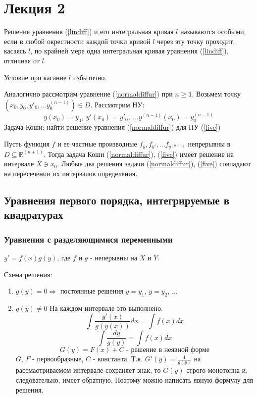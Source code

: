 \section{Лекция 2}
  \begin{df}
  Решение уравнения (\ref{lindiff}) и его интегральная кривая $l$ называются особыми, если в любой окрестности каждой точки кривой $l$ через эту точку проходит, касаясь $l$, по крайней мере одна интегральная кривая уравнения (\ref{lindiff}), отличная от $l$.
  \end{df}
  \begin{ntc}
  Условие про касание $l$ избыточно.
  \end{ntc}
  
  Аналогично рассмотрим уравнение (\ref{normaldiffur}) при $n \geqslant 1$.
  Возьмем точку $(x_0, y_0, y'_0, \ldots y_0^{(n-1)}) \in D$. Рассмотрим НУ:
  \begin{equation}
  \label{five}
  y(x_0) = y_0,~ y'(x_0) = y'_0,~ \ldots y^{(n - 1)}(x_0) = y^{(n - 1)}_0
  \end{equation}   
  Задача Коши: найти  решение уравнения (\ref{normaldiffur}) для НУ (\ref{five})
  \begin{teo}
  Пусть функция $f$ и ее частные производные $f_y, f_{y'}, \ldots f_{y^{(n + 1)}} $ непрерывны в $ D \subseteq \mathbb{R}^{(n + 1)}$. Тогда задача Коши (\ref{normaldiffur}), (\ref{five}) имеет решение на интервале $X \ni x_0$. Любые два решения задачи (\ref{normaldiffur}), (\ref{five}) совпадают на пересечении их интервалов определения.
  \end{teo}
  
  \subsection{Уравнения первого порядка, интегрируемые в квадратурах}
  \subsubsection{Уравнения с разделяющимися переменными}
  $\boxed{y' = f(x)g(y) }$, где $f$ и $g$ - неперывны на $X$ и $Y$. 
  
  \noindent Схема решения:
  \begin{enumerate}
  
  \item $g(y) = 0 \Rightarrow$ постоянные решения $y = y_1$, $y = y_2$, $\ldots$
  \item $g(y) \neq 0$ На каждом интервале это выполнено.
  $$ \int \frac{y'(x)}{g(y(x))}dx = \int f(x)dx $$
  $$ \int \frac{dy}{g(y)} = \int f(x)dx $$
  $$ G(y) = F(x) + C \text{ - решение в неявной форме} $$
  $G$, $F$ - первообразные, $C$ - константа.
  Т.к. $G'(y) = \frac{1}{g(y)}$ на рассмаотриваемом интервале сохраняет знак, то $G(y)$ строго монотонна и, следовательно, имеет обратную. Поэтому можно написать явную формулу для решения.
  \end{enumerate}
  
